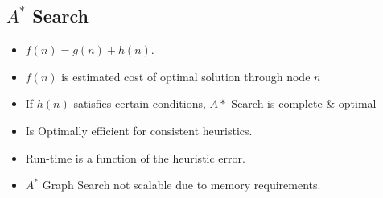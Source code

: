 \subsection{$A^*$ Search}
\begin{itemize}
    \item $f(n) = g(n) + h(n)$.
    \item $f(n)$ is estimated cost of optimal solution through node $n$
    \item If $h(n)$ satisfies certain conditions, $A*$ Search is complete & optimal
    \item Is Optimally efficient for consistent heuristics.
    \item Run-time is a function of the heuristic error.
    \item $A^*$ Graph Search not scalable due to memory requirements.
\end{itemize}
